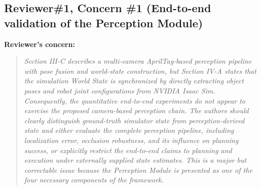 \documentclass[11pt]{article}
\newif\ifshowstatus
\newcommand{\statusline}[2]{\ifshowstatus\par\noindent\textcolor{status#1}{\textbf{Status: \MakeUppercase{#1}.} #2}\par\smallskip\fi}
\newenvironment{concern}[3][pending]{\subsection*{\ifshowstatus\textcolor{status#1}{#2}\else#2\fi}\statusline{#1}{#3}\textbf{Reviewer's concern:}\begin{quote}\itshape}{\end{quote}}
\begin{document}
\begin{concern}[pending]{Reviewer\#1, Concern \#1 (End-to-end validation of the Perception Module)}{Needs A1 (perception benchmark with 6-DoF ground truth), A2 (physical Transfer trials), and B1 (bootstrap noise injection).}
Section III-C describes a multi-camera AprilTag-based perception pipeline with pose fusion and world-state construction, but Section IV-A states that the simulation World State is synchronized by directly extracting object poses and robot joint configurations from NVIDIA Isaac Sim.
Consequently, the quantitative end-to-end experiments do not appear to exercise the proposed camera-based perception chain.
The authors should clearly distinguish ground-truth simulator state from perception-derived state and either evaluate the complete perception pipeline, including localization error, occlusion robustness, and its influence on planning success, or explicitly restrict the end-to-end claims to planning and execution under externally supplied state estimates.
This is a major but correctable issue because the Perception Module is presented as one of the four necessary components of the framework.
\end{concern}
\end{document}
